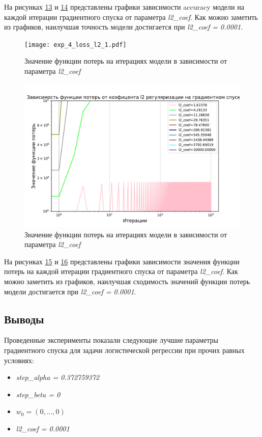\documentclass[14pt]{extarticle}
\begin{document}
На рисунках \hyperref[fig:exp_4_acc_l2_1]{13} и \hyperref[fig:exp_4_acc_l2_2]{14} представлены графики зависимости accuracy модели на каждой итерации градиентного спуска от параметра \textit{l2\_coef}. Как можно заметить из графиков, наилучшая точность модели достигается при \textit{l2\_coef = 0.0001}.

\begin{figure}[H]
    \centering
    \texttt{[image: exp\_4\_loss\_l2\_1.pdf]}
    \caption{Значение функции потерь на итерациях модели в зависимости от параметра \textit{l2\_coef}}
    \label{fig:exp_4_loss_l2_1}
\end{figure}

\begin{figure}[H]
    \centering
    \includegraphics[width=0.7\linewidth]
    {exp_4_loss_l2_2.pdf}
    \caption{Значение функции потерь на итерациях модели в зависимости от параметра \textit{l2\_coef}}
    \label{fig:exp_4_loss_l2_2}
\end{figure}

На рисунках \hyperref[fig:exp_4_loss_l2_1]{15} и \hyperref[fig:exp_4_loss_l2_2]{16} представлены графики зависимости значения функции потерь на каждой итерации градиентного спуска от параметра \textit{l2\_coef}. Как можно заметить из графиков, наилучшая сходимость значений функции потерь модели достигается при \textit{l2\_coef = 0.0001}.

\subsection{Выводы}
Проведенные эксперименты показали следующие лучшие параметры градиентного спуска для задачи логистической регрессии при прочих равных условиях:
\begin{itemize}
    \item \textit{step\_alpha = 0.372759372}
    \item \textit{step\_beta = 0}
    \item \textit{$ w_0 = (0, ... , 0)$}
    \item \textit{l2\_coef = 0.0001}
\end{itemize}
\end{document}
